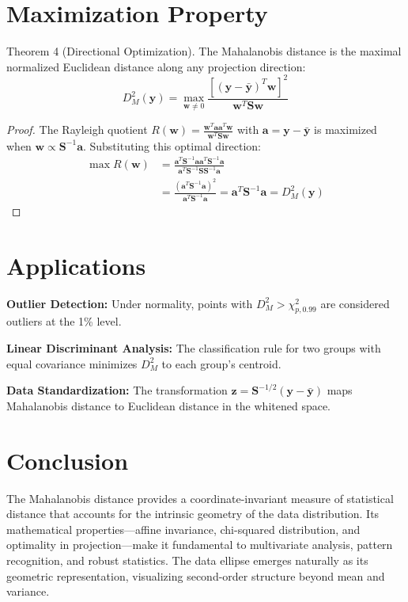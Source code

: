 \documentclass{article}
\begin{document}
\section*{Maximization Property}

Theorem 4 (Directional Optimization).
The Mahalanobis distance is the maximal normalized Euclidean distance along any projection direction:
\begin{equation}
    D_M^2(\mathbf{y}) = \max_{\mathbf{w}\neq 0} \frac{[(\mathbf{y} - \bar{\mathbf{y}})^T\mathbf{w}]^2}{\mathbf{w}^T\mathbf{S}\mathbf{w}}
\end{equation}

\begin{proof}
The Rayleigh quotient $R(\mathbf{w}) = \frac{\mathbf{w}^T\mathbf{a}\mathbf{a}^T\mathbf{w}}{\mathbf{w}^T\mathbf{S}\mathbf{w}}$ with $\mathbf{a} = \mathbf{y} - \bar{\mathbf{y}}$ is maximized when $\mathbf{w} \propto \mathbf{S}^{-1}\mathbf{a}$. Substituting this optimal direction:
\begin{align*}
    \max R(\mathbf{w}) &= \frac{\mathbf{a}^T\mathbf{S}^{-1}\mathbf{a}\mathbf{a}^T\mathbf{S}^{-1}\mathbf{a}}{\mathbf{a}^T\mathbf{S}^{-1}\mathbf{S}\mathbf{S}^{-1}\mathbf{a}} \\
    &= \frac{(\mathbf{a}^T\mathbf{S}^{-1}\mathbf{a})^2}{\mathbf{a}^T\mathbf{S}^{-1}\mathbf{a}} = \mathbf{a}^T\mathbf{S}^{-1}\mathbf{a} = D_M^2(\mathbf{y})
\end{align*}
\end{proof}

\section*{Applications}

\textbf{Outlier Detection:} Under normality, points with $D_M^2 > \chi^2_{p,0.99}$ are considered outliers at the 1\% level.

\textbf{Linear Discriminant Analysis:} The classification rule for two groups with equal covariance minimizes $D_M^2$ to each group's centroid.

\textbf{Data Standardization:} The transformation $\mathbf{z} = \mathbf{S}^{-1/2}(\mathbf{y} - \bar{\mathbf{y}})$ maps Mahalanobis distance to Euclidean distance in the whitened space.

\section*{Conclusion}

The Mahalanobis distance provides a coordinate-invariant measure of statistical distance that accounts for the intrinsic geometry of the data distribution. Its mathematical properties—affine invariance, chi-squared distribution, and optimality in projection—make it fundamental to multivariate analysis, pattern recognition, and robust statistics. The data ellipse emerges naturally as its geometric representation, visualizing second-order structure beyond mean and variance.
\end{document}
